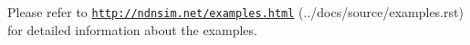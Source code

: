 Please refer to \href{http://ndnsim.net/examples.html}{\tt http\+://ndnsim.\+net/examples.\+html} (../docs/source/examples.rst) for detailed information about the examples. 